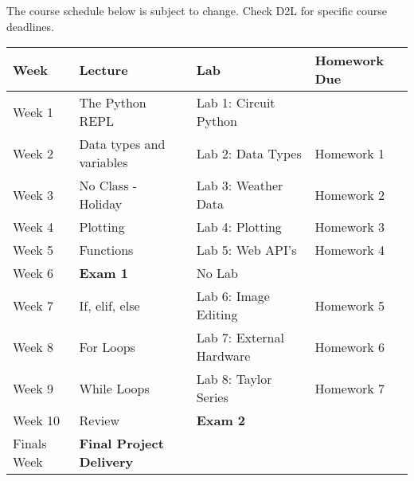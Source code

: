 \documentclass[11pt]{article}
\begin{document}
The course schedule below is subject to change. Check D2L for specific
course deadlines.

\begin{longtable}[]{@{}llll@{}}
\toprule
Week & Lecture & Lab & Homework Due\tabularnewline
\midrule
\endhead
Week 1 & The Python REPL & Lab 1: Circuit Python &\tabularnewline
Week 2 & Data types and variables & Lab 2: Data Types & Homework
1\tabularnewline
Week 3 & No Class - Holiday & Lab 3: Weather Data & Homework
2\tabularnewline
Week 4 & Plotting & Lab 4: Plotting & Homework 3\tabularnewline
Week 5 & Functions & Lab 5: Web API's & Homework 4\tabularnewline
Week 6 & \textbf{Exam 1} & No Lab &\tabularnewline
Week 7 & If, elif, else & Lab 6: Image Editing & Homework
5\tabularnewline
Week 8 & For Loops & Lab 7: External Hardware & Homework
6\tabularnewline
Week 9 & While Loops & Lab 8: Taylor Series & Homework 7\tabularnewline
Week 10 & Review & \textbf{Exam 2} &\tabularnewline
Finals Week & \textbf{Final Project Delivery} & &\tabularnewline
\bottomrule
\end{longtable}



    
    
    
\end{document}
